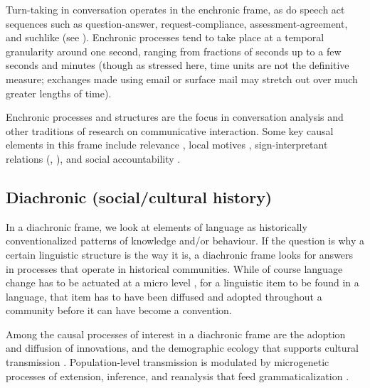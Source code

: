 Turn-taking in conversation operates in the enchronic 
frame, as do speech act sequences such as question-answer, 
request-compliance, assessment-agreement, and suchlike (see \citealt{enfield_language_2014}). Enchronic processes tend to take place at a temporal 
granularity around one second, ranging from fractions of seconds up to 
a few seconds and minutes (though as stressed here, time units are not 
the definitive measure; exchanges made using email or surface mail may stretch out over much greater lengths of time). 



Enchronic processes and structures are the focus in 
conversation analysis and other traditions of research on communicative 
interaction. Some key causal elements in this frame include relevance \citep{garfinkel_studies_1967,grice_logic_1975,dan_sperber_relevance:_1995}, local motives \citep{schutz_phenomenology_1970,leontev_problems_1981,heritage_garfinkel_1984}, sign-interpretant relations (\citealt{kockelman_semiotic_2005,kockelman_agent_2013}, \citealt[Chapter 4]{enfield_relationship_2013}), and social accountability \citep{garfinkel_studies_1967,heritage_garfinkel_1984}.



\subsection{Diachronic (social/cultural history)}


In a diachronic frame, we look at elements of language as historically 
conventionalized patterns of knowledge and/or behaviour. If the question 
is why a certain linguistic structure is the way it is, a diachronic 
frame looks for answers in processes that operate in historical 
communities. While of course language change has to be actuated at a 
micro level \citep{weinreich_empirical_1968,labov_mechanism_1986,eckert_linguistic_2000}, for a linguistic item to be found in a language, that 
item has to have been diffused and adopted throughout a community 
before it can have become a convention. 



Among the causal processes of interest in a diachronic frame are the 
adoption and diffusion of innovations, and the demographic ecology that 
supports cultural transmission \citep{rogers_diffusion_2003}. Population-level 
transmission is modulated by microgenetic processes of extension, inference, and reanalysis that feed grammaticalization 
\citep{hopper_grammaticalization_1993}. 



